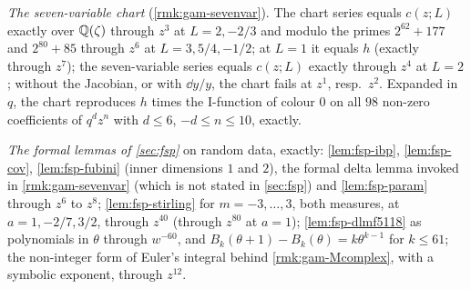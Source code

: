 \emph{The seven-variable chart} (\cref{rmk:gam-sevenvar}). The chart series equals $c(z;L)$ exactly over $\mathbb{Q}(\zeta)$ through $z^3$ at $L=2,-2/3$ and modulo the primes $2^{62}+177$ and $2^{80}+85$ through $z^6$ at $L=3,5/4,-1/2$; at $L=1$ it equals $h$ (exactly through $z^7$); the seven-variable series equals $c(z;L)$ exactly through $z^4$ at $L=2$; without the Jacobian, or with $\dd y/y$, the chart fails at $z^1$, resp.\ $z^2$. Expanded in $q$, the chart reproduces $h$ times the I-function of colour $0$ on all $98$ non-zero coefficients of $q^dz^n$ with $d\leq 6$, $-d\leq n\leq 10$, exactly.

\emph{The formal lemmas of \cref{sec:fsp}} on random data, exactly: \cref{lem:fsp-ibp}, \cref{lem:fsp-cov}, \cref{lem:fsp-fubini} (inner dimensions $1$ and $2$), the formal delta lemma invoked in \cref{rmk:gam-sevenvar} (which is not stated in \cref{sec:fsp}) and \cref{lem:fsp-param} through $z^6$ to $z^8$; \cref{lem:fsp-stirling} for $m=-3,\dots,3$, both measures, at $a=1,-2/7,3/2$, through $z^{40}$ (through $z^{80}$ at $a=1$); \cref{lem:fsp-dlmf5118} as polynomials in $\theta$ through $w^{-60}$, and $B_k(\theta+1)-B_k(\theta)=k\theta^{k-1}$ for $k\leq 61$; the non-integer form of Euler's integral behind \cref{rmk:gam-Mcomplex}, with a symbolic exponent, through $z^{12}$.
